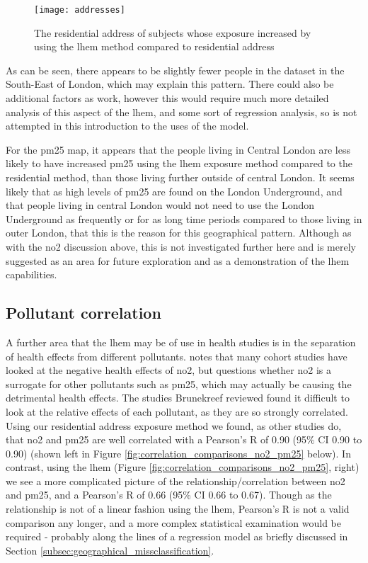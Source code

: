 \begin{figure}[H]
\centering
\texttt{[image: addresses]}
\caption{The residential address of subjects whose exposure increased by using the \gls{lhem} method compared to residential address}
\label{fig:addresses}
\end{figure}

As can be seen, there appears to be slightly fewer people in the dataset in the South-East of London, which may explain this pattern. There could also be additional factors as work, however this would require much more detailed analysis of this aspect of the \gls{lhem}, and some sort of regression analysis, so is not attempted in this introduction to the uses of the model.

For the \gls{pm25} map, it appears that the people living in Central London are less likely to have increased \gls{pm25} using the \gls{lhem} exposure method compared to the residential method, than those living further outside of central London. It seems likely that as high levels of \gls{pm25} are found on the London Underground, and that people living in central London would not need to use the London Underground as frequently or for as long time periods compared to those living in outer London, that this is the reason for this geographical pattern. Although as with the \gls{no2} discussion above, this is not investigated further here and is merely suggested as an area for future exploration and as a demonstration of the \gls{lhem} capabilities.

\subsection{Pollutant correlation}
\label{subsec:pollutant_correlation}

A further area that the \gls{lhem} may be of use in health studies is in the separation of health effects from different pollutants. \cite{Brunekreef2007} notes that many cohort studies have looked at the negative health effects of \gls{no2}, but questions whether \gls{no2} is a surrogate for other pollutants such as \gls{pm25}, which may actually be causing the detrimental health effects. The studies Brunekreef reviewed found it difficult to look at the relative effects of each pollutant, as they are so strongly correlated. Using our residential address exposure method we found, as other studies do, that \gls{no2} and \gls{pm25} are well correlated with a Pearson's R of 0.90 (95\% CI 0.90 to 0.90) (shown left in Figure \ref{fig:correlation_comparisons_no2_pm25} below). In contrast, using the \gls{lhem} (Figure \ref{fig:correlation_comparisons_no2_pm25}, right) we see a more complicated picture of the relationship/correlation between \gls{no2} and \gls{pm25}, and a Pearson's R of 0.66 (95\% CI 0.66 to 0.67). Though as the relationship is not of a linear fashion using the \gls{lhem}, Pearson's R is not a valid comparison any longer, and a more complex statistical examination would be required - probably along the lines of a regression model as briefly discussed in Section \ref{subsec:geographical_missclassification}.

